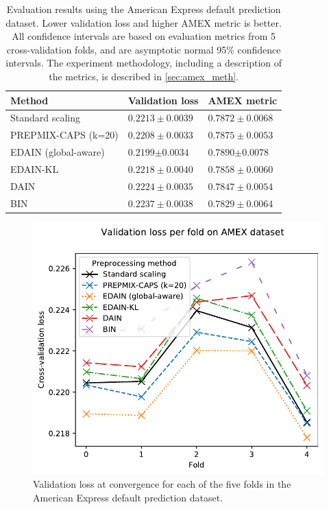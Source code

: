 \documentclass{statsmsc}
\begin{document}
{%
\begin{table}[htp]
    \centering
    \begin{tabular}{lll}
        \toprule
        Method & Validation loss & AMEX metric \\
        \midrule
        Standard scaling & $0.2213 \pm 0.0039$ & $0.7872 \pm 0.0068$ \\
        PREPMIX-CAPS (k=20) & $0.2208 \pm 0.0033$ & $0.7875 \pm 0.0053$ \\
        EDAIN (global-aware) & $\mathbf{0.2199} \bm\pm \mathbf{0.0034}$ & $\mathbf{0.7890} \bm\pm \mathbf{0.0078}$ \\
        EDAIN-KL & $0.2218 \pm 0.0040$ & $0.7858 \pm 0.0060$ \\
        DAIN & $0.2224 \pm 0.0035$ & $0.7847 \pm 0.0054$ \\
        BIN & $0.2237 \pm 0.0038$ & $0.7829 \pm 0.0064$ \\
        \bottomrule
    \end{tabular}%
    \label{tab:amex_performance}%
    \caption{
        Evaluation results using the American Express default prediction dataset. Lower validation
        loss and higher AMEX metric is better.
        All confidence intervals are based on evaluation metrics from 5 cross-validation folds,
        and are asymptotic normal 95\% confidence intervals.
        The experiment methodology, including a description of the metrics,
        is described in  \cref{sec:amex_meth}.
}
\end{table}


\begin{figure}[htp]
\begin{center}
    \includegraphics[scale=1]{figures/amex_performance_convergence_per_fold}
\end{center}
\caption{Validation loss at convergence for each of the five folds in the American Express
default prediction dataset.}
\label{fig:amex_folds}
\end{figure}


}
\end{document}
